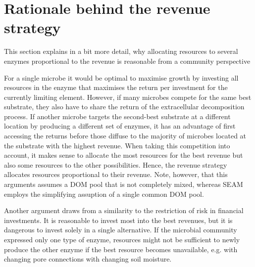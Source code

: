 \section{Rationale behind the revenue strategy \label{app:revenueRational}}    

This section explains in a bit more detail, why allocating resources to several
enzymes proportional to the revenue is reasonable from a community
perspective

For a single microbe it would be optimal to maximise growth by investing all
resources in the enzyme that maximises the return per investment for the
currently limiting element.
However, if many microbes compete for the same best substrate, they also have to
share the return of the extracellular decomposition process. If another microbe
targets the second-best substrate at a different location by producing a
different set of enzymes, it has an advantage of first accessing the
returns before those diffuse to the majority of microbes located at the
substrate with the highest revenue.
When taking this competition into account, it makes sense to allocate the most
resources for the best revenue but also some resources to the other
possibilities. Hence, the revenue strategy allocates resources proportional to
their revenue. Note, however, that this arguments assumes a DOM pool that is
not completely mixed, whereas SEAM employs the simplifying
assuption of a single common DOM pool.

Another argument draws from a similarity to the restriction of risk in financial
investments. It is reasonable to invest most into the best revenues, but it is
dangerous to invest solely in a single alternative. If the microbial community
expressed only one type of enzyme, resources might not be sufficient to
newly produce the other enzyme if the best resource becomes
unavailable, e.g. with changing pore connections with changing soil moisture.





